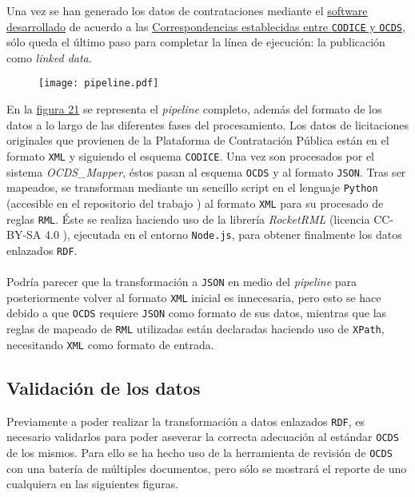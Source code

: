     
    Una vez se han generado los datos de contrataciones mediante el \hyperref[sec:software]{software desarrollado} de acuerdo a las \hyperref[sec:correspondencias]{Correspondencias establecidas entre \texttt{CODICE} y \texttt{OCDS}}, sólo queda el último paso para completar la línea de ejecución: la publicación como \textit{linked data}.

    \begin{figure}[h]
        \centering
        \texttt{[image: pipeline.pdf]}
        \label{fig:pipeline}
    \end{figure}
    
    \noindent En la \hyperref[fig:pipeline]{figura 21} se representa el \textit{pipeline} completo, además del formato de los datos a lo largo de las diferentes fases del procesamiento. Los datos de licitaciones originales que provienen de la Plataforma de Contratación Pública están en el formato \texttt{XML} y siguiendo el esquema \texttt{CODICE}. Una vez son procesados por el sistema \textit{OCDS\_Mapper}, éstos pasan al esquema \texttt{OCDS} y al formato \texttt{JSON}. Tras ser mapeados, se transforman mediante un sencillo script en el lenguaje \texttt{Python} (accesible en el repositorio del trabajo \cite{SCRIPTGEN}) al formato \texttt{XML} para su procesado de reglas \texttt{RML}. Éste se realiza haciendo uso de la librería \textit{RocketRML} \cite{ROCKETRML} (licencia CC-BY-SA 4.0 \cite{LICCC}), ejecutada en el entorno \texttt{Node.js}, para obtener finalmente los datos enlazados \texttt{RDF}.
    \\ \\
    Podría parecer que la transformación a \texttt{JSON} en medio del \textit{pipeline} para posteriormente volver al formato \texttt{XML} inicial es innecesaria, pero esto se hace debido a que \texttt{OCDS} requiere \texttt{JSON} como formato de sus datos, mientras que las reglas de mapeado de \texttt{RML} utilizadas están declaradas haciendo uso de \texttt{XPath}, necesitando \texttt{XML} como formato de entrada.
    
    \subsection{Validación de los datos}
        Previamente a poder realizar la transformación a datos enlazados \texttt{RDF}, es necesario validarlos para poder aseverar la correcta adecuación al estándar \texttt{OCDS} de los mismos. Para ello se ha hecho uso de la herramienta de revisión de \texttt{OCDS} \cite{OCDSREVIEWTOOL} con una batería de múltiples documentos, pero sólo se mostrará el reporte de uno cualquiera en las siguientes figuras.
        
